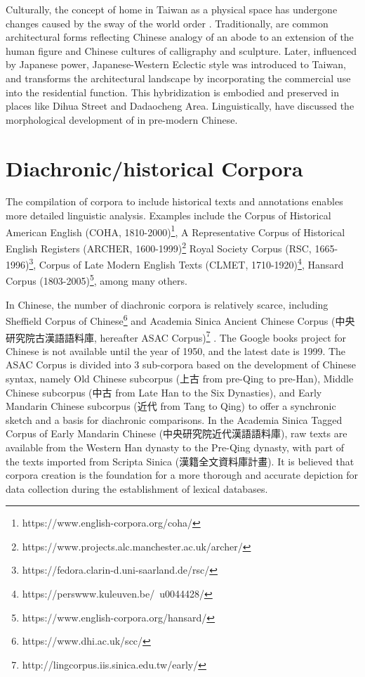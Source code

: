 Culturally, the concept of home in Taiwan as a physical space has undergone changes caused by the sway of the world order \parencite{沈孟穎2015台灣現代住宅設計之轉化}. Traditionally,  are common architectural forms reflecting Chinese analogy of an abode to an extension of the human figure and Chinese cultures of calligraphy and sculpture. Later, influenced by Japanese power, Japanese-Western Eclectic style was introduced to Taiwan, and  transforms the architectural landscape by incorporating the commercial use into the residential function. This hybridization is embodied and preserved in places like Dihua Street and Dadaocheng Area. Linguistically, \textcite{wang2005jia} have discussed the morphological development of \jia in pre-modern Chinese.

\section{Diachronic/historical Corpora}
The compilation of corpora to include historical texts and annotations enables more detailed linguistic analysis. Examples include
the Corpus of Historical American English (COHA, 1810-2000)\footnote{https://www.english-corpora.org/coha/}, 
A Representative Corpus of Historical English Registers (ARCHER, 1600-1999)\footnote{https://www.projects.alc.manchester.ac.uk/archer/}
Royal Society Corpus (RSC, 1665-1996)\footnote{https://fedora.clarin-d.uni-saarland.de/rsc/}, 
Corpus of Late Modern English Texts (CLMET, 1710-1920)\footnote{https://perswww.kuleuven.be/~u0044428/}, 
Hansard Corpus (1803-2005)\footnote{https://www.english-corpora.org/hansard/}, among many others.

In Chinese, the number of diachronic corpora is relatively scarce, including Sheffield Corpus of Chinese\footnote{https://www.dhi.ac.uk/scc/} and Academia Sinica Ancient Chinese Corpus (中央研究院古漢語語料庫, hereafter ASAC Corpus)\footnote{http://lingcorpus.iis.sinica.edu.tw/early/} \parencite{wei1997corpus}. The Google books project for Chinese is not available until the year of 1950, and the latest date is 1999. The ASAC Corpus is divided into 3 sub-corpora based on the development of Chinese syntax, namely Old Chinese subcorpus (上古 from pre-Qing to pre-Han), Middle Chinese subcorpus (中古 from Late Han to the Six Dynasties), and Early Mandarin Chinese subcorpus (近代 from Tang to Qing) to offer a synchronic sketch and a basis for diachronic comparisons. In the Academia Sinica Tagged Corpus of Early Mandarin Chinese (中央研究院近代漢語語料庫), raw texts are available from the Western Han dynasty to the Pre-Qing dynasty, with part of the texts imported from Scripta Sinica (漢籍全文資料庫計畫). It is believed that corpora creation is the foundation for a more thorough and accurate depiction for data collection during the establishment of lexical databases.

